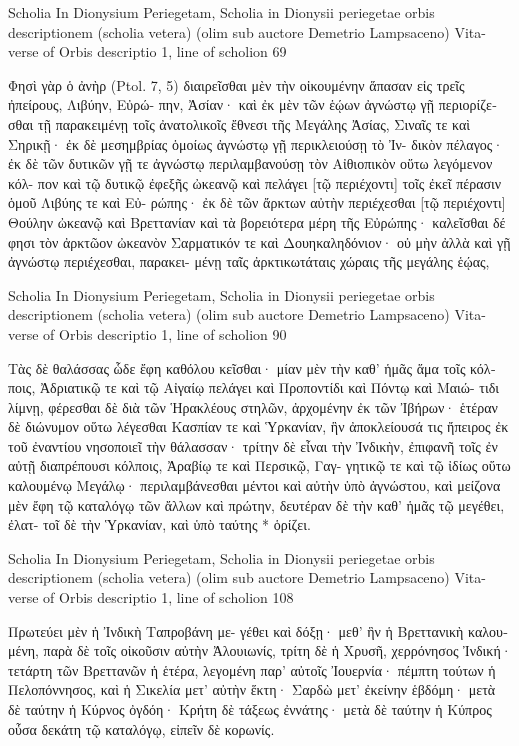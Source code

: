 \documentclass[12pt,letterpaper,twoside,final]{memoir}
\begin{document}
\begin{greek}
Scholia In Dionysium Periegetam, Scholia in Dionysii periegetae orbis descriptionem (scholia vetera) (olim sub auctore Demetrio Lampsaceno) 
Vita-verse of Orbis descriptio 1, line of scholion 69

Φησὶ γὰρ ὁ ἀνὴρ (Ptol. 7, 5) διαιρεῖσθαι μὲν τὴν 
οἰκουμένην ἅπασαν εἰς τρεῖς ἠπείρους, Λιβύην, Εὐρώ-
πην, Ἀσίαν· καὶ ἐκ μὲν τῶν ἑῴων ἀγνώστῳ γῇ 
περιορίζεσθαι τῇ παρακειμένῃ τοῖς ἀνατολικοῖς ἔθνεσι 
τῆς Μεγάλης Ἀσίας, Σιναῖς τε καὶ Σηρικῇ· ἐκ δὲ 
μεσημβρίας ὁμοίως ἀγνώστῳ γῇ περικλειούσῃ τὸ Ἰν-
δικὸν πέλαγος· ἐκ δὲ τῶν δυτικῶν γῇ τε ἀγνώστῳ 
περιλαμβανούσῃ τὸν Αἰθιοπικὸν οὕτω λεγόμενον κόλ-
πον καὶ τῷ δυτικῷ ἐφεξῆς ὠκεανῷ καὶ πελάγει [τῷ 
περιέχοντι] τοῖς ἐκεῖ πέρασιν ὁμοῦ Λιβύης τε καὶ Εὐ-
ρώπης· ἐκ δὲ τῶν ἄρκτων αὐτὴν περιέχεσθαι [τῷ 
περιέχοντι] Θούλην ὠκεανῷ καὶ Βρεττανίαν καὶ τὰ 
βορειότερα μέρη τῆς Εὐρώπης· καλεῖσθαι δέ φησι τὸν 
ἀρκτῶον ὠκεανὸν Σαρματικόν τε καὶ Δουηκαληδόνιον· 
οὐ μὴν ἀλλὰ καὶ γῇ ἀγνώστῳ περιέχεσθαι, παρακει-
μένῃ ταῖς ἀρκτικωτάταις χώραις τῆς μεγάλης ἑῴας, 




Scholia In Dionysium Periegetam, Scholia in Dionysii periegetae orbis descriptionem (scholia vetera) (olim sub auctore Demetrio Lampsaceno) 
Vita-verse of Orbis descriptio 1, line of scholion 90

Τὰς δὲ θαλάσσας ὧδε ἔφη καθόλου κεῖσθαι· μίαν μὲν 
τὴν καθ' ἡμᾶς ἅμα τοῖς κόλποις, Ἀδριατικῷ τε καὶ τῷ 
Αἰγαίῳ πελάγει καὶ Προποντίδι καὶ Πόντῳ καὶ Μαιώ-
τιδι λίμνῃ, φέρεσθαι δὲ διὰ τῶν Ἡρακλέους στηλῶν, 
ἀρχομένην ἐκ τῶν Ἰβήρων· ἑτέραν δὲ διώνυμον οὕτω 
λέγεσθαι Κασπίαν τε καὶ Ὑρκανίαν, ἣν ἀποκλείουσά 
τις ἤπειρος ἐκ τοῦ ἐναντίου νησοποιεῖ τὴν θάλασσαν· 
τρίτην δὲ εἶναι τὴν Ἰνδικὴν, ἐπιφανῆ τοῖς ἐν αὐτῇ 
διαπρέπουσι κόλποις, Ἀραβίῳ τε καὶ Περσικῷ, Γαγ-
γητικῷ τε καὶ τῷ ἰδίως οὕτω καλουμένῳ Μεγάλῳ· 
περιλαμβάνεσθαι μέντοι καὶ αὐτὴν ὑπὸ ἀγνώστου, 
καὶ μείζονα μὲν ἔφη τῷ καταλόγῳ τῶν ἄλλων καὶ 
πρώτην, δευτέραν δὲ τὴν καθ' ἡμᾶς τῷ μεγέθει, ἐλατ-
τοῖ δὲ τὴν Ὑρκανίαν, καὶ ὑπὸ ταύτης * ὁρίζει. 



Scholia In Dionysium Periegetam, Scholia in Dionysii periegetae orbis descriptionem (scholia vetera) (olim sub auctore Demetrio Lampsaceno) 
Vita-verse of Orbis descriptio 1, line of scholion 108

           Πρωτεύει μὲν ἡ Ἰνδικὴ Ταπροβάνη με-
γέθει καὶ δόξῃ· μεθ' ἣν ἡ Βρεττανικὴ καλουμένη, παρὰ 
δὲ τοῖς οἰκοῦσιν αὐτὴν Ἀλουιωνίς, τρίτη δὲ ἡ Χρυσῆ, 
χερρόνησος Ἰνδική· τετάρτη τῶν Βρεττανῶν ἡ ἑτέρα, 
λεγομένη παρ' αὐτοῖς Ἰουερνία· πέμπτη τούτων ἡ 
Πελοπόννησος, καὶ ἡ Σικελία μετ' αὐτὴν ἕκτη· Σαρδὼ 
μετ' ἐκείνην ἑβδόμη· μετὰ δὲ ταύτην ἡ Κύρνος ὀγδόη· 
Κρήτη δὲ τάξεως ἐννάτης· μετὰ δὲ ταύτην ἡ Κύπρος 
οὖσα δεκάτη τῷ καταλόγῳ, εἰπεῖν δὲ κορωνίς. 




\end{greek}
\end{document}
